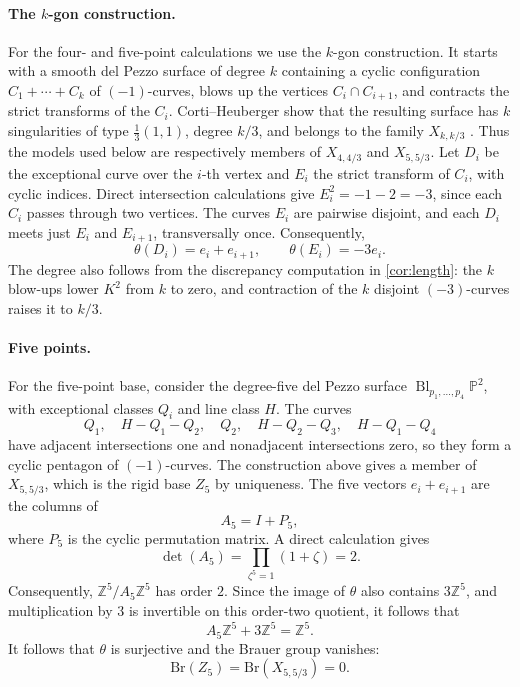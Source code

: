 \documentclass[11pt]{article}
\theoremstyle{plain}
\theoremstyle{definition}
\theoremstyle{remark}
\newcommand{\Pp}{\mathbb P}
\newcommand{\Z}{\mathbb Z}
\newcommand{\Bl}{\operatorname{Bl}}
\newcommand{\Br}{\mathrm{Br}}
\begin{document}
\paragraph{The \(k\)-gon construction.}
For the four- and five-point calculations we use the \(k\)-gon construction.
It starts with a smooth del Pezzo surface of degree \(k\) containing a cyclic
configuration \(C_1+\cdots+C_k\) of \((-1)\)-curves, blows up the vertices
\(C_i\cap C_{i+1}\), and contracts the strict transforms of the \(C_i\).
Corti--Heuberger show that the resulting surface has \(k\) singularities of
type \(\frac13(1,1)\), degree \(k/3\), and belongs to the family
\(X_{k,k/3}\) \cite[Section~3.5, ``\(k\)-gons'']{Corti2016}. Thus the
models used below are respectively members of \(X_{4,4/3}\) and
\(X_{5,5/3}\). Let \(D_i\) be the exceptional curve over the
\(i\)-th vertex and \(E_i\) the strict transform of \(C_i\), with cyclic
indices. Direct intersection calculations give
\(E_i^2=-1-2=-3\), since each \(C_i\) passes through two vertices.
The curves \(E_i\) are pairwise disjoint, and each \(D_i\) meets just
\(E_i\) and \(E_{i+1}\), transversally once. Consequently,
\[
\theta(D_i)=e_i+e_{i+1},
\qquad
\theta(E_i)=-3e_i.
\]
The degree also follows from the discrepancy computation in
\cref{cor:length}: the \(k\) blow-ups lower \(K^2\) from \(k\) to zero,
and contraction of the \(k\) disjoint \((-3)\)-curves raises it to
\(k/3\).

\paragraph{Five points.}
For the five-point base, consider the degree-five del Pezzo surface
\(\Bl_{p_1,\dots,p_4}\Pp^2\), with exceptional classes \(Q_i\) and line
class \(H\). The curves
\[
Q_1,\quad H-Q_1-Q_2,\quad Q_2,\quad H-Q_2-Q_3,\quad H-Q_1-Q_4
\]
have adjacent intersections one and nonadjacent intersections zero, so
they form a cyclic pentagon of \((-1)\)-curves. The construction above
gives a member of \(X_{5,5/3}\), which is the rigid base \(Z_5\) by
uniqueness. The five vectors
\(e_i+e_{i+1}\) are the columns of
\[
A_5=I+P_5,
\]
where \(P_5\) is the cyclic permutation matrix. A direct calculation gives
\[
\det(A_5)=\prod_{\zeta^5=1}(1+\zeta)=2.
\]
Consequently, \(\Z^5/A_5\Z^5\) has order \(2\). Since the image of \(\theta\) also
contains \(3\Z^5\), and multiplication by \(3\) is invertible on this
order-two quotient, it follows that
\[
A_5\Z^5+3\Z^5=\Z^5.
\]
It follows that \(\theta\) is surjective and the Brauer group vanishes:
\[
\Br(Z_5)=\Br(X_{5,5/3})=0.
\]
\end{document}
